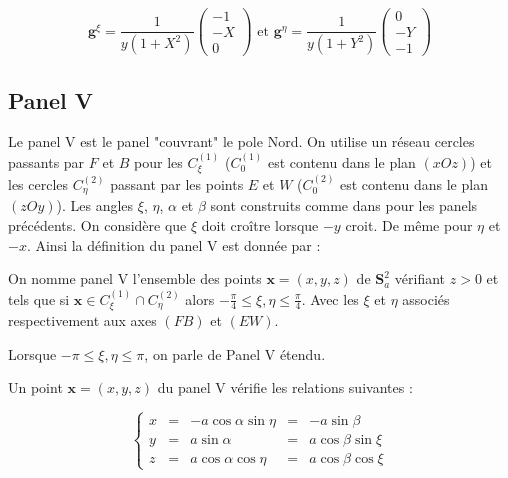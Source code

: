 \begin{equation}
\mathbf{g}^{\xi} = \dfrac{1}{y(1+X^2)}\begin{pmatrix}
-1 \\ -X \\ 0
\end{pmatrix} \text{ et } \mathbf{g}^{\eta} = \dfrac{1}{y(1+Y^2)}\begin{pmatrix}
0 \\ -Y \\ -1
\end{pmatrix}
\label{eq: base duale IV}
\end{equation}













\subsection{Panel V}

Le panel V est le panel "couvrant" le pole Nord. On utilise un réseau cercles passants par $F$ et $B$ pour les $C_{\xi}^{(1)}$ ($C_{0}^{(1)}$ est contenu dans le plan $(xOz)$) et les cercles $C_{\eta}^{(2)}$ passant par les points $E$ et $W$ ($C_{0}^{(2)}$ est contenu dans le plan $(zOy)$). Les angles $\xi$, $\eta$, $\alpha$ et $\beta$ sont construits comme dans pour les panels précédents.  On considère que $\xi$ doit croître lorsque $-y$ croit. De même pour $\eta$ et $-x$. 
Ainsi la définition du panel V est donnée par :

\begin{definition}
On nomme panel V l'ensemble des points $\mathbf{x}=(x,y,z)$ de $\mathbf{S}_a^2$ vérifiant $z>0$ et tels que si $\mathbf{x} \in C_{\xi}^{(1)} \cap C_{\eta}^{(2)}$ alors $-\frac{\pi}{4}\leq \xi,\eta \leq \frac{\pi}{4}$. Avec les $\xi$ et $\eta$ associés respectivement aux axes $(FB)$ et $(EW)$.

Lorsque $-\pi \leq \xi,\eta \leq \pi$, on parle de Panel V étendu.
\end{definition}

Un point $\mathbf{x}=(x,y,z)$ du panel V vérifie les relations suivantes :

\begin{equation}
\left\lbrace
\begin{array}{rcccc}
x & = & -a \cos \alpha \sin \eta & = & - a \sin \beta \\
y & = & a \sin \alpha & = & a \cos \beta \sin \xi \\
z & = & a \cos \alpha \cos \eta & = & a \cos \beta \cos \xi
\end{array}
\right.
\end{equation}

